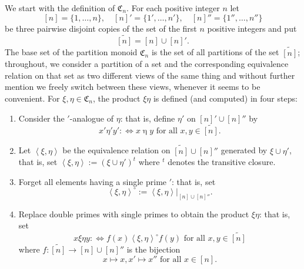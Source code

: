 \documentclass[preprint,1p,times]{elsarticle}
\numberwithin{equation}{section}
\theoremstyle{remark}
\def\C{\mathfrak{C}}
\begin{document}
We start with the definition of $\C_n$. For each positive integer $n$ let
$$[n]=\{1,\dots,n\},\quad [n]'=\{1',\dots,n'\},\quad [n]''=\{1'',\dots,n''\}$$
be three pairwise disjoint copies of the set of the first $n$ positive integers and put
$$\widetilde{[n]}=[n]\cup [n]'.$$
The base set of the partition monoid $\C_n$ is the set of all partitions of the set $\widetilde{[n]}$; throughout, we
consider a partition of a set and the corresponding equivalence relation on that set as two different views of the same
thing and without further mention we freely switch between these views, whenever it seems to be convenient. For
$\xi,\eta\in \C_n$, the product $\xi\eta$ is defined (and computed) in four steps:
\begin{enumerate}
\item Consider the $'$-analogue of $\eta$: that is, define $\eta'$
on ${[n]'}\cup {[n]''}$ by
$${x'}\mathrel{\eta'}{y'}:\Leftrightarrow x\mathrel{\eta}
y\text{ for all } x,y\in \widetilde{[n]}.$$
\item Let $\left<\xi,\eta\right>$ be the equivalence relation on
$\widetilde{[n]}\cup {[n]''}$ generated by $\xi\cup {\eta'}$, that is, set $\left<\xi,\eta\right>:=(\xi\cup {\eta'})^t$
where $^t$ denotes the transitive closure.
\item Forget all elements having a single prime $'$: that is, set
$$\left<\xi,\eta\right>^\circ:=\left<\xi,\eta\right>|_{[n]\cup{[n]''}}.$$
\item Replace  double primes with single primes to
obtain the product $\xi\eta$: that is, set
$$x\mathrel{\xi\eta}y:\Leftrightarrow f(x)\mathrel{\left<\xi,\eta\right>^\circ}f(y)
\text{ for all }x,y\in \widetilde{[n]}$$ where $f:\widetilde{[n]}\to [n]\cup{[n]''}$ is the bijection
$$x\mapsto x, x'\mapsto x'' \text{ for all } x\in [n].$$
\end{enumerate}
\end{document}

